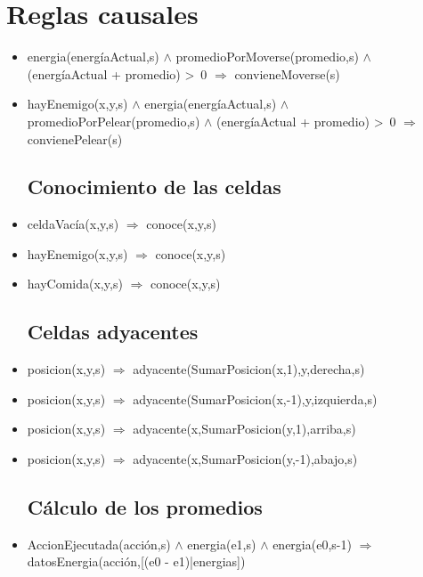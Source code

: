\section{Reglas causales}

\begin{itemize}

\subsection{Conveniencia de moverse y pelear}
\item  energia(energíaActual,s)
$\land$ promedioPorMoverse(promedio,s) $\land$ (energíaActual + promedio) >~0
$\Rightarrow$ convieneMoverse(s)

\item hayEnemigo(x,y,s) $\land$ energia(energíaActual,s)
$\land$ promedioPorPelear(promedio,s) $\land$ (energíaActual + promedio) >~0
$\Rightarrow$ convienePelear(s)

\subsection{Conocimiento de las celdas}
\item celdaVacía(x,y,s) $\Rightarrow$
 conoce(x,y,s)
 
\item hayEnemigo(x,y,s) $\Rightarrow$
 conoce(x,y,s)

\item hayComida(x,y,s) $\Rightarrow$
 conoce(x,y,s)

\subsection{Celdas adyacentes}
\item posicion(x,y,s) $\Rightarrow$ adyacente(SumarPosicion(x,1),y,derecha,s)

\item posicion(x,y,s) $\Rightarrow$ adyacente(SumarPosicion(x,-1),y,izquierda,s)

\item posicion(x,y,s) $\Rightarrow$ adyacente(x,SumarPosicion(y,1),arriba,s)

\item posicion(x,y,s) $\Rightarrow$ adyacente(x,SumarPosicion(y,-1),abajo,s)

\subsection{Cálculo de los promedios}
\item AccionEjecutada(acción,s) $\land$ energia(e1,s) $\land$ energia(e0,s-1)
$\Rightarrow$
     datosEnergia(acción,[(e0 - e1)|energias])
     

\end{itemize}
